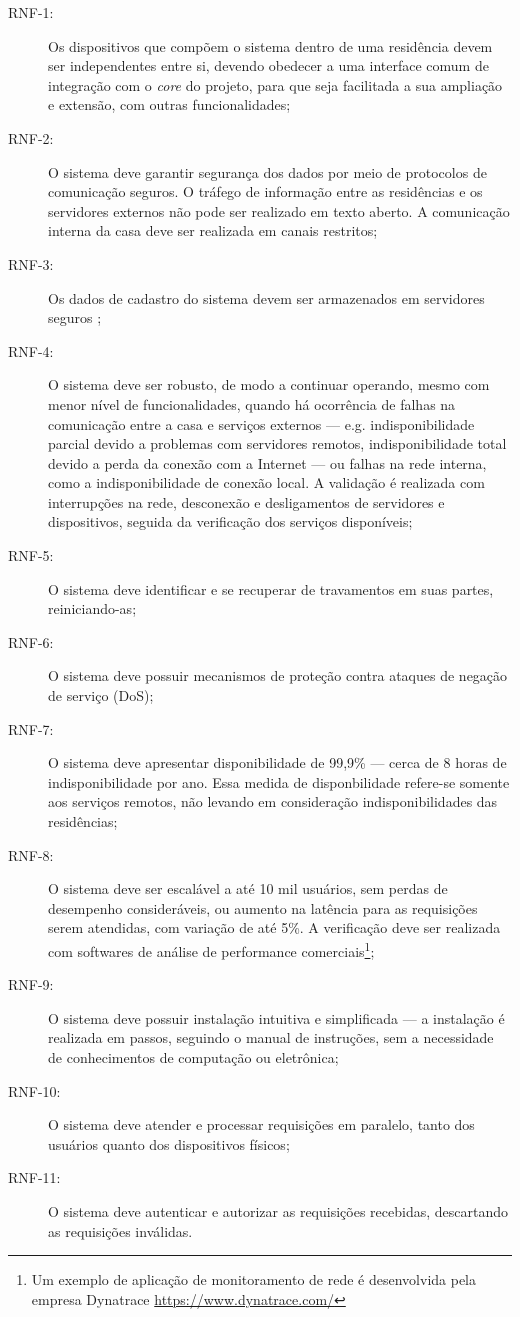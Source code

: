\begin{description}
\item[RNF-1:]Os dispositivos que compõem o sistema dentro de uma residência devem ser independentes entre si, devendo obedecer a uma interface comum de integração com o \emph{core} do projeto, para que seja facilitada a sua ampliação e extensão, com outras funcionalidades;
\item[RNF-2:]O sistema deve garantir segurança dos dados por meio de protocolos de comunicação seguros. O tráfego de informação entre as residências e os servidores externos não pode ser realizado em texto aberto. A comunicação interna da casa deve ser realizada em canais restritos;
\item[RNF-3:]Os dados de cadastro do sistema devem ser armazenados em servidores seguros \cite{softwareSecurity};
\item[RNF-4:]O sistema deve ser robusto, de modo a continuar operando, mesmo com menor nível de funcionalidades, quando há ocorrência de falhas na comunicação entre a casa e serviços externos --- e.g. indisponibilidade parcial devido a problemas com servidores remotos, indisponibilidade total devido a perda da conexão com a Internet --- ou falhas na rede interna, como a indisponibilidade de conexão local. A validação é realizada com interrupções na rede, desconexão e desligamentos de servidores e dispositivos, seguida da verificação dos serviços disponíveis;
\item[RNF-5:]O sistema deve identificar e se recuperar de travamentos em suas partes, reiniciando-as;
\item[RNF-6:]O sistema deve possuir mecanismos de proteção contra ataques de negação de serviço (DoS);
\item[RNF-7:]O sistema deve apresentar disponibilidade de 99,9\% --- cerca de 8 horas de indisponibilidade por ano. Essa medida de disponbilidade refere-se somente aos serviços remotos, não levando em consideração indisponibilidades das residências;
\item[RNF-8:]O sistema deve ser escalável a até 10 mil usuários, sem perdas de desempenho consideráveis, ou aumento na latência para as requisições serem atendidas, com variação de até 5\%. A verificação deve ser realizada com softwares de análise de performance comerciais\footnote{Um exemplo de aplicação de monitoramento de rede é desenvolvida pela empresa Dynatrace \url{https://www.dynatrace.com/} };
\item[RNF-9:]O sistema deve possuir instalação intuitiva e simplificada --- a instalação é realizada em passos, seguindo o manual de instruções, sem a necessidade de conhecimentos de computação ou eletrônica;
\item[RNF-10:]O sistema deve atender e processar requisições em paralelo, tanto dos usuários quanto dos dispositivos físicos;
\item[RNF-11:]O sistema deve autenticar e autorizar as requisições recebidas, descartando as requisições inválidas.
\end{description}

